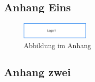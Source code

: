 \subsection{Anhang Eins}
\Blindtext
\begin{figure}[!ht]
    \centering
    \includegraphics[width=0.3\textwidth,angle=0]{src/anhang/abbildungen/abb_anhang1.png}
    \caption[Abbildung im Anhang]{Abbildung im Anhang}
   \label{fig:Abbildung im Anhang}
   \end{figure}

\Blindtext

\subsection{Anhang zwei}
\Blindtext
